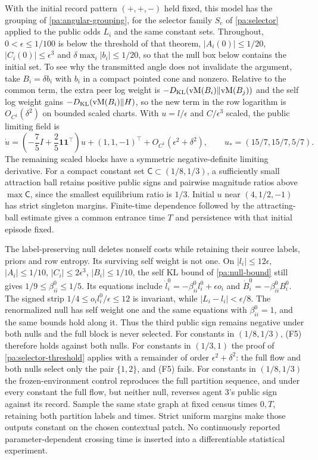 With the initial record pattern $(+,+,-)$ held fixed, this model has the grouping of \cref{pa:angular-grouping}, for the selector family $S_c$ of \cref{pa:selector} applied to the public odds $L_i$ and the same constant sets. Throughout, $0<\epsilon\leq1/100$ is below the threshold of that theorem, $|A_i(0)|\leq1/20$, $|C_i(0)|\leq\epsilon^3$ and $\delta\max_i|b_i|\leq1/20$, so that the null box below contains the initial set. To see why the transmitted angle does not invalidate the argument, take $B_i=\delta b_i$ with $b_i$ in a compact pointed cone and nonzero. Relative to the common term, the extra peer log weight is $-D_{\mathrm{KL}}(\mathrm{vM}(B_i)\Vert\mathrm{vM}(B_j))$ and the self log weight gains $-D_{\mathrm{KL}}(\mathrm{vM}(B_i)\Vert H)$, so the new term in the row logarithm is $O_{C^1}(\delta^2)$ on bounded scaled charts. With $u=l/\epsilon$ and $C/\epsilon^3$ scaled, the public limiting field is
\begin{equation}
 \dot u=\left(-\frac75I+\frac25\mathbf1\mathbf1^\top\right)u
 +(1,1,-1)^\top+O_{C^1}(\epsilon^2+\delta^2),\qquad
 u_*=(15/7,15/7,5/7).
 \label{lp:selection-limit}
\end{equation}
The remaining scaled blocks have a symmetric negative-definite limiting derivative. For a compact constant set $\mathsf C\subset(1/8,1/3)$, a sufficiently small attraction ball retains positive public signs and pairwise magnitude ratios above $\max\mathsf C$, since the smallest equilibrium ratio is $1/3$. Initial $u$ near $(4,1/2,-1)$ has strict singleton margins. Finite-time dependence followed by the attracting-ball estimate gives a common entrance time $T$ and persistence with that initial episode fixed.

The label-preserving null deletes nonself costs while retaining their source labels, priors and row entropy. Its surviving self weight is not one. On $|l_i|\le12\epsilon$, $|A_i|\le1/10$, $|C_i|\le2\epsilon^3$, $|B_i|\le1/10$, the self KL bound of \cref{pa:null-bound} still gives $1/9\le\beta_{ii}^0\le1/5$. Its equations include $\dot l_i^0=-\beta_{ii}^0l_i^0+\epsilon o_i$ and $\dot B_i^0=-\beta_{ii}^0B_i^0$. The signed strip $1/4\le o_i l_i^0/\epsilon\le12$ is invariant, while $|L_i-l_i|<\epsilon/8$. The renormalized null has self weight one and the same equations with $\beta^0_{ii}=1$, and the same bounds hold along it. Thus the third public sign remains negative under both nulls and the full block is never selected. For constants in $(1/8,1/3)$, (F5) therefore holds against both nulls. For constants in $(1/3,1)$ the proof of \cref{pa:selector-threshold} applies with a remainder of order $\epsilon^2+\delta^2$: the full flow and both nulls select only the pair $\{1,2\}$, and (F5) fails. For constants in $(1/8,1/3)$ the frozen-environment control reproduces the full partition sequence, and under every constant the full flow, but neither null, reverses agent $3$'s public sign against its record. Sample the same state graph at fixed census times $0,T$, retaining both partition labels and times. Strict uniform margins make those outputs constant on the chosen contextual patch. No continuously reported parameter-dependent crossing time is inserted into a differentiable statistical experiment.

